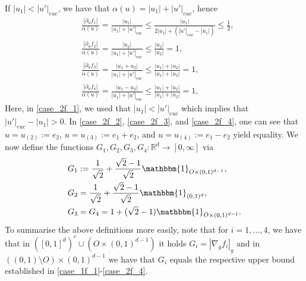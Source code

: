 \documentclass[a4paper,10pt]{article}
\numberwithin{equation}{section}
\newcommand{\R}{\mathbb{R}}
\begin{document}
If $|u_1|< |u'|_{euc}$, we have that $\alpha(u) = |u_1|+|u'|_{euc}$, hence
\begin{align}
    &\frac{|\partial_u f_1|}{\alpha(u)} = \frac{|u_1|}{|u_1|+|u'|_{euc}} \leq \frac{|u_1|}{2|u_1|+(|u'|_{euc}-|u_1|)}\leq \frac{1}{2},\label{case_2f_1}\\
    &\frac{|\partial_u f_2|}{\alpha(u)} = \frac{|u_2|}{|u_1|+|u'|_{euc}} \leq \frac{|u_2|}{|u_2|}= 1,\label{case_2f_2}\\
    &\frac{|\partial_u f_3|}{\alpha(u)} = \frac{|u_1+u_2|}{|u_1|+|u'|_{euc}} \leq \frac{|u_1|+|u_2|}{|u_1|+|u_2|}= 1,\label{case_2f_3}\\
    &\frac{|\partial_u f_4|}{\alpha(u)} = \frac{|u_1-u_2|}{|u_1|+|u'|_{euc}} \leq \frac{|u_1|+|u_2|}{|u_1|+|u_2|}= 1\label{case_2f_4},
\end{align}
Here, in \eqref{case_2f_1}, we used that $|u_1| < |u'|_{euc}$ which implies that $|u'|_{euc}-|u_1|>0$. In \eqref{case_2f_2}, \eqref{case_2f_3}, and \eqref{case_2f_4}, one can see that $u=u_{(2)}:= e_2$, $u=u_{(3)}:=e_1+e_2$, and $u=u_{(4)}:=e_1-e_2$ yield equality.
We now define the functions $G_1, G_2, G_3, G_4: \R^d \to [0, \infty]$ via
\begin{align}\label{min_weak_upper_grad_def_ex1}
    &G_1 := \frac{1}{\sqrt{2}} + \frac{\sqrt{2}-1}{\sqrt{2}}{\mathbbm{1}_{ O\times (0,1)^{d-1}}},\nonumber\\
    & G_2=\frac{1}{\sqrt{2}}+ \frac{\sqrt{2}-1}{\sqrt{2}}\mathbbm{1}_{(0,1)^d},\nonumber \\
    & G_3=G_4 = 1+(\sqrt{2}-1)\mathbbm{1}_{O \times (0,1)^{d-1}}.
\end{align}
To summarise the above definitions more easily, note that for $i=1, \ldots, 4$, we have that in $([0,1]^d)^c \cup (O \times (0,1)^{d-1})$ it holds $G_i = |\nabla_g f_i|_g$ and in $((0,1)\setminus O) \times (0,1)^{d-1}$ we have that $G_i$ equals the respective upper bound established in \eqref{case_1f_1}-\eqref{case_2f_4}.
\smallskip
\end{document}
